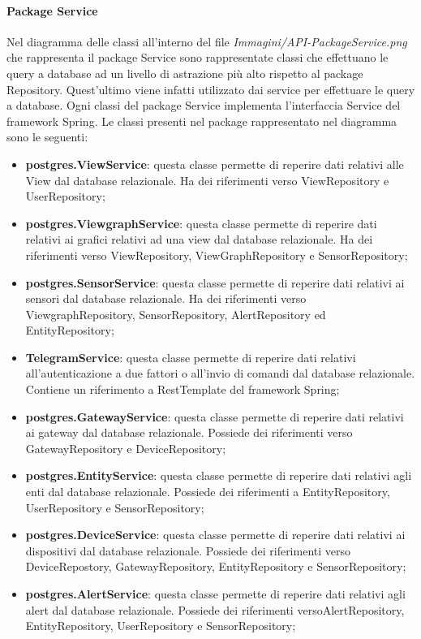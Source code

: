 \begin{landscape}
		\paragraph*{Package Service}
		Nel diagramma delle classi all'interno del file \textit{Immagini/API-PackageService.png} che rappresenta il package Service sono rappresentate classi che effettuano le query a database ad un livello di astrazione più alto rispetto al package Repository. Quest'ultimo viene infatti utilizzato dai service per effettuare le query a database.
		Ogni classi del package Service implementa l'interfaccia Service del framework Spring.
		Le classi presenti nel package rappresentato nel diagramma sono le seguenti:
		\begin{itemize}
			\item \textbf{postgres.ViewService}: questa classe permette di reperire dati relativi alle View dal database relazionale. Ha dei riferimenti verso ViewRepository e UserRepository;
			\item \textbf{postgres.ViewgraphService}: questa classe permette di reperire dati relativi ai grafici relativi ad una view dal database relazionale. Ha dei riferimenti verso ViewRepository, ViewGraphRepository e SensorRepository;
			\item \textbf{postgres.SensorService}: questa classe permette di reperire dati relativi ai sensori dal database relazionale. Ha dei riferimenti verso ViewgraphRepository, SensorRepository, AlertRepository ed EntityRepository;
			\item \textbf{TelegramService}: questa classe permette di reperire dati relativi all'autenticazione a due fattori o all'invio di comandi dal database relazionale. Contiene un riferimento a RestTemplate del framework Spring;
			\item \textbf{postgres.GatewayService}: questa classe permette di reperire dati relativi ai gateway dal database relazionale. Possiede dei riferimenti verso GatewayRepository e DeviceRepository;
			\item \textbf{postgres.EntityService}: questa classe permette di reperire dati relativi agli enti dal database relazionale. Possiede dei riferimenti a EntityRepository, UserRepository e SensorRepository;
			\item \textbf{postgres.DeviceService}: questa classe permette di reperire dati relativi ai dispositivi  dal database relazionale. Possiede dei riferimenti verso DeviceRepostory, GatewayRepository, EntityRepository e SensorRepository;
			\item \textbf{postgres.AlertService}: questa classe permette di reperire dati relativi agli alert dal database relazionale. Possiede dei riferimenti versoAlertRepository, EntityRepository, UserRepository e SensorRepository;

\end{itemize}
\end{landscape}
